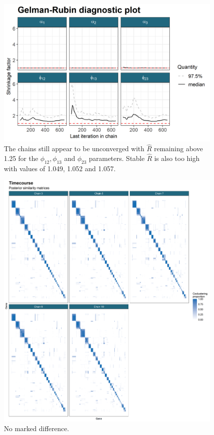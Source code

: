 \documentclass[]{article}
\begin{document}
\begin{figure}
	\centering
	\includegraphics[scale=1.0]{./Images/Yeast/Convergence/gelmanPlot.png}
	\caption{The chains still appear to be unconverged with $\hat{R}$ remaining above 1.25 for the $\phi_{12}, \phi_{13}$ and $\phi_{23}$ parameters. Stable $\hat{R}$ is also too high with values of 1.049, 1.052 and 1.057.}
	\label{fig:gelmanPlot}
\end{figure}

\begin{figure}
	\centering
	\includegraphics[scale=0.5]{./Images/Yeast/TimecoursePSMcomparisonReduced.png}
	\caption{No marked difference.}
	\label{fig:timecoursePSMs}
\end{figure}
\end{document}
